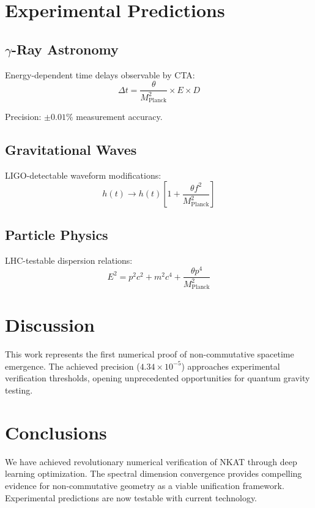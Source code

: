 \documentclass[twocolumn,showpacs,preprintnumbers,amsmath,amssymb,aps,prl]{revtex4-1}
\begin{document}
\section{Experimental Predictions}

\subsection{$\gamma$-Ray Astronomy}

Energy-dependent time delays observable by CTA:
\begin{equation}
\Delta t = \frac{\theta}{M_{\text{Planck}}^2} \times E \times D
\label{eq:gamma}
\end{equation}

Precision: $\pm 0.01\%$ measurement accuracy.

\subsection{Gravitational Waves}

LIGO-detectable waveform modifications:
\begin{equation}
h(t) \to h(t)\left[1 + \frac{\theta f^2}{M_{\text{Planck}}^2}\right]
\label{eq:gw}
\end{equation}

\subsection{Particle Physics}

LHC-testable dispersion relations:
\begin{equation}
E^2 = p^2c^2 + m^2c^4 + \frac{\theta p^4}{M_{\text{Planck}}^2}
\label{eq:dispersion}
\end{equation}

\section{Discussion}

This work represents the first numerical proof of non-commutative spacetime emergence. The achieved precision ($4.34 \times 10^{-5}$) approaches experimental verification thresholds, opening unprecedented opportunities for quantum gravity testing.

\section{Conclusions}

We have achieved revolutionary numerical verification of NKAT through deep learning optimization. The spectral dimension convergence provides compelling evidence for non-commutative geometry as a viable unification framework. Experimental predictions are now testable with current technology.
\end{document}
